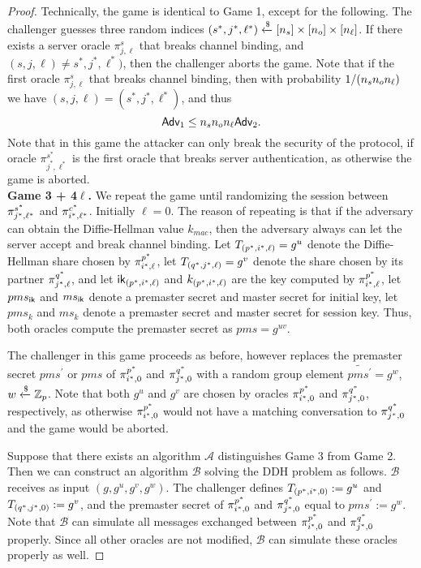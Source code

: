 \begin{proof}
 Technically, the game is identical to Game 1, except for the following. The challenger guesses three random indices $(s^{\ast}, j^{\ast}, \ell^{\ast}) \xleftarrow{\$} [n_s] \times [n_o] \times [n_{\ell}]$. If there exists a server oracle $\pi^s_{j,\ell}$ that breaks channel binding, and $(s, j, \ell) \neq s^{\ast}, j^{\ast}, \ell^{\ast})$, then the challenger aborts the game. Note that if the first oracle $\pi^s_{j,\ell}$ that breaks channel binding, then with probability $1/(n_s n_o n_{\ell})$ we have $(s,j,\ell) = (s^{\ast}, j^{\ast}, \ell^{\ast})$, and thus
 \begin{equation}
  \mathsf{Adv}_1 \leq n_s n_o n_{\ell} \mathsf{Adv}_2.
 \end{equation}%
 Note that in this game the attacker can only break the security of the protocol, if oracle $\pi^{s^{\ast}}_{j^{\ast},\ell^{\ast}}$ is the first oracle that breaks server authentication, as otherwise the game is aborted.
\vspace{10pt}\\%
%
%
 \textbf{Game 3 + 4$\ell$.} We repeat the game until randomizing the session between $\pi^{s^{\ast}}_{j^{\ast},\ell^{\ast}}$ and $\pi^{c^{\ast}}_{i^{\ast},\ell^{\ast}}$. Initially $\ell = 0$. The reason of repeating is that if the adversary can obtain the Diffie-Hellman value $k_{mac}$, then the adversary always can let the server accept and break channel binding.
 Let $T_{(p^{\ast}, i^{\ast}, \ell)} = g^u$ denote the Diffie-Hellman share chosen by $\pi^{p^{\ast}}_{i^{\ast},\ell}$, let $T_{(q^{\ast}, j^{\ast}, \ell)} = g^v$ denote the share chosen by its partner $\pi^{q^{\ast}}_{j^{\ast},\ell}$, and let $\mathsf{ik}_{(p^{\ast}, i^{\ast}, \ell)}$ and $k_{(p^{\ast}, i^{\ast}, \ell)}$ are the key computed by $\pi^{p^{\ast}}_{i^{\ast},\ell}$, let $pms_{\mathsf{ik}}$ and $ms_{\mathsf{ik}}$ denote a premaster secret and master secret for initial key, let $pms_{k}$ and $ms_{k}$ denote a premaster secret and master secret for session key. Thus, both oracles compute the premaster secret as $pms = g^{uv}$.

 The challenger in this game proceeds as before, however replaces the premaster secret $pms^{\prime}$ or $pms$ of $\pi^{p^{\ast}}_{i^{\ast},0}$ and $\pi^{q^{\ast}}_{j^{\ast},0}$ with a random group element $\widetilde{pms^{\prime}} = g^w$, $w \xleftarrow{\$} \mathbb{Z}_p$. Note that both $g^u$ and $g^v$ are chosen by oracles $\pi^{p^{\ast}}_{i^{\ast},0}$ and $\pi^{q^{\ast}}_{j^{\ast},0}$, respectively, as otherwise $\pi^{p^{\ast}}_{i^{\ast},0}$ would not have a matching conversation to $\pi^{q^{\ast}}_{j^{\ast},0}$ and the game would be aborted.

 Suppose that there exists an algorithm $\mathcal{A}$ distinguishes Game 3 from Game 2. Then we can construct an algorithm $\mathcal{B}$ solving the DDH problem as follows. $\mathcal{B}$ receives as input $(g,g^u,g^v,g^w)$. The challenger defines $T_{(p^{\ast}, i^{\ast}, 0)} := g^u$ and $T_{(q^{\ast}, j^{\ast}, 0)} := g^v$, and the premaster secret of $\pi^{p^{\ast}}_{i^{\ast},0}$ and $\pi^{q^{\ast}}_{j^{\ast},0}$ equal to $pms^{\prime} := g^w$. Note that $\mathcal{B}$ can simulate all messages exchanged between $\pi^{p^{\ast}}_{i^{\ast},0}$ and $\pi^{q^{\ast}}_{j^{\ast},0}$ properly. Since all other oracles are not modified, $\mathcal{B}$ can simulate these oracles properly as well.


\end{proof}
